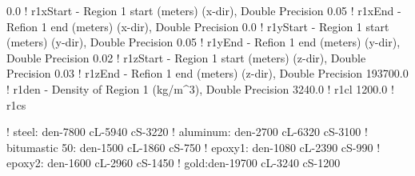 0.0        ! r1xStart - Region 1 start (meters) (x-dir), Double Precision
0.05        ! r1xEnd - Refion 1 end (meters) (x-dir), Double Precision
0.0         ! r1yStart - Region 1 start (meters) (y-dir), Double Precision
0.05         ! r1yEnd - Refion 1 end (meters) (y-dir), Double Precision
0.02         ! r1zStart - Region 1 start (meters) (z-dir), Double Precision
0.03      ! r1zEnd - Refion 1 end (meters) (z-dir), Double Precision
193700.0      ! r1den - Density of Region 1 (kg/m^3), Double Precision
3240.0	    ! r1cl
1200.0      ! r1cs

!  steel: den-7800 cL-5940 cS-3220
!  aluminum: den-2700 cL-6320 cS-3100
!  bitumastic 50: den-1500 cL-1860 cS-750
!  epoxy1: den-1080 cL-2390 cS-990
!  epoxy2: den-1600 cL-2960 cS-1450
!  gold:den-19700 cL-3240 cS-1200
